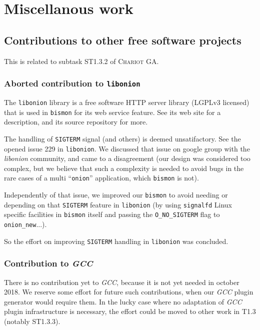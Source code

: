 \section{Miscellanous work}
\label{sec:miscwork}

\subsection{Contributions to other free software projects}

\label{subsec:contribfree}
This is related to subtask ST1.3.2 of \textsc{Chariot} GA.

\subsubsection{Aborted contribution to \texttt{libonion}}
\label{subsubsec:contriblibonion}
The \texttt{libonion} library is a free software HTTP server library
(LGPLv3 licensed) that is used in \texttt{bismon} for its web service
feature. See its web site 
for a description, and its source repository
 for more.

The handling of \texttt{SIGTERM} signal (and others) is deemed
unsatifactory. See the opened issue 229 {} in
\texttt{libonion}.  We discussed that issue on google group with the
\emph{libonion} community, and came to a disagreement (our design was
considered too complex, but we believe that such a complexity is
needed to avoid bugs in the rare cases of a multi ``\texttt{onion}''
application, which \texttt{bismon} is not).

Independently of that issue, we improved our \texttt{bismon} to avoid
needing or depending on that \texttt{SIGTERM} feature in
\texttt{libonion} (by using \texttt{signalfd} Linux specific
facilities in \texttt{bismon} itself and passing the
\texttt{O\_NO\_SIGTERM} flag to \texttt{onion\_new}...).

So the effort on improving \texttt{SIGTERM} handling in
\texttt{libonion} was concluded.

\subsubsection{Contribution to \emph{GCC}}
\label{subsubsec:contribgcc}
There is no contribution yet to \emph{GCC}, because it is not yet
needed in october 2018. We reserve some effort for future such
contributions, when our \emph{GCC} plugin generator would require
them. In the lucky case where no adaptation of \emph{GCC} plugin
infrastructure is necessary, the effort could be moved to other work
in T1.3 (notably ST1.3.3).

